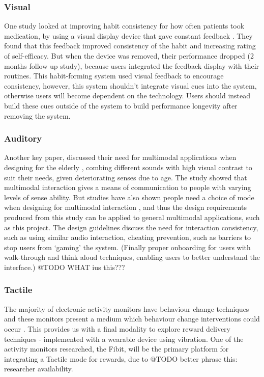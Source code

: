 \subsubsection*{Visual}
One study looked at improving habit consistency for how often patients took medication, by using a visual display device that gave constant feedback \cite{article_realtime_feedback_improving_medication_taking}. They found that this feedback improved consistency of the habit and increasing rating of self-efficacy. But when the device was removed, their performance dropped (2 months follow up study), because users integrated the feedback display with their routines. This habit-forming system used visual feedback to encourage consistency, however, this system shouldn't integrate visual cues into the system, otherwise users will become dependent on the technology. Users should instead build these cues outside of the system to build performance longevity after removing the system.

\subsubsection*{Auditory}
Another key paper, discussed their need for multimodal applications when designing for the elderly \cite{article_movipill_improving_medication_elders}, combing different sounds with high visual contrast to suit their needs, given deteriorating senses due to age. The study showed that multimodal interaction gives a means of communication to people with varying levels of sense ability. But studies have also shown people need a choice of mode when designing for multimodal interaction \cite{article_user_centred_multimodal_reminders}, and thus the design requirements produced from this study can be applied to general multimodal applications, such as this project. The design guidelines discuss the need for interaction consistency, such as using similar audio interaction, cheating prevention, such as barriers to stop users from `gaming' the system. (Finally proper onboarding for users with walk-through and think aloud techniques, enabling users to better understand the interface.) @TODO WHAT ius this???

\subsubsection*{Tactile}
The majority of electronic activity monitors have behaviour change techniques and these monitors present a medium which behaviour change interventions could occur \cite{article_wearable_good}. This provides us with a final modality to explore reward delivery techniques - implemented with a wearable device using vibration. One of the activity monitors researched, the Fibit, will be the primary platform for integrating a Tactile mode for rewards, due to @TODO better phrase this: researcher availability.

